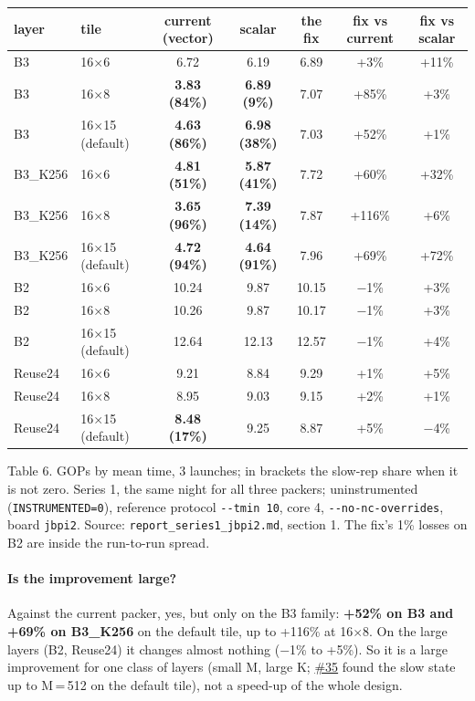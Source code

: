 \documentclass[10pt,a4paper]{article}
\newcommand{\iss}[1]{\href{https://github.com/JieGH/RVV_code_gen_via_MLIR_xDSL/issues/#1}{\##1}}
\newcommand{\bad}[1]{\textcolor{red!70!black}{\textbf{#1}}}
\newcommand{\key}[1]{\textbf{\textcolor{blue!55!black}{#1}}}  %
\begin{document}
\begin{center}\footnotesize\setlength{\tabcolsep}{4pt}
\begin{tabular}{@{}llccccc@{}}
\toprule
layer & tile & current (vector) & scalar & the fix & fix vs current & fix vs scalar \\
\midrule
B3 & 16$\times$6 & 6.72 & 6.19 & 6.89 & +3\% & +11\% \\
B3 & 16$\times$8 & \bad{3.83 (84\%)} & \bad{6.89 (9\%)} & 7.07 & +85\% & +3\% \\
B3 & 16$\times$15 (default) & \bad{4.63 (86\%)} & \bad{6.98 (38\%)} & 7.03 & +52\% & +1\% \\
B3\_K256 & 16$\times$6 & \bad{4.81 (51\%)} & \bad{5.87 (41\%)} & 7.72 & +60\% & +32\% \\
B3\_K256 & 16$\times$8 & \bad{3.65 (96\%)} & \bad{7.39 (14\%)} & 7.87 & +116\% & +6\% \\
B3\_K256 & 16$\times$15 (default) & \bad{4.72 (94\%)} & \bad{4.64 (91\%)} & 7.96 & +69\% & +72\% \\
\midrule
B2 & 16$\times$6 & 10.24 & 9.87 & 10.15 & $-$1\% & +3\% \\
B2 & 16$\times$8 & 10.26 & 9.87 & 10.17 & $-$1\% & +3\% \\
B2 & 16$\times$15 (default) & 12.64 & 12.13 & 12.57 & $-$1\% & +4\% \\
Reuse24 & 16$\times$6 & 9.21 & 8.84 & 9.29 & +1\% & +5\% \\
Reuse24 & 16$\times$8 & 8.95 & 9.03 & 9.15 & +2\% & +1\% \\
Reuse24 & 16$\times$15 (default) & \bad{8.48 (17\%)} & 9.25 & 8.87 & +5\% & $-$4\% \\
\bottomrule
\end{tabular}
\end{center}
{\footnotesize Table 6. GOPs by mean time, 3 launches; in brackets the slow-rep share when it is not zero. Series 1, the same night for all
three packers; uninstrumented (\texttt{INSTRUMENTED=0}), reference protocol \texttt{-{}-tmin 10}, core 4, \texttt{-{}-no-nc-overrides},
board \texttt{jbpi2}. Source: \texttt{report\_series1\_jbpi2.md}, section 1. The fix's 1\% losses on B2 are inside the run-to-run spread.}

\paragraph{Is the improvement large?} Against the current packer, yes, but only on the B3 family: \key{+52\% on B3 and +69\%
on B3\_K256} on the default tile, up to +116\% at 16$\times$8. On the large layers (B2, Reuse24) it changes almost nothing ($-$1\% to
+5\%). So it is a large improvement for one class of layers (small M, large K; \iss{35} found the slow state up to M\,=\,512 on the default
tile), not a speed-up of the whole design.
\end{document}

